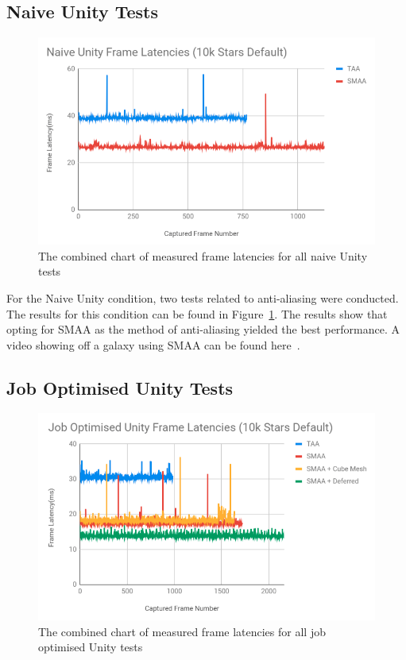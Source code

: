 \subsection{Naive Unity Tests}
\begin{figure}[!p]
    \centering
    \includegraphics[width=1\textwidth]{Figures/naiveUnityLatencies.png}
    \caption[Combined Frame Latency Chart for Naive Unity Tests]{The combined chart of measured frame latencies for all naive Unity tests}
    \label{fig:naiveUnityLatency}
\end{figure}

For the Naive Unity condition, two tests related to anti-aliasing were conducted. The results for this condition can be found in Figure~\ref{fig:naiveUnityLatency}. The results show that opting for SMAA as the method of anti-aliasing yielded the best performance. A video showing off a galaxy using SMAA can be found here~\cite{naiveUnityVideo}. 

\subsection{Job Optimised Unity Tests}
\begin{figure}[!p]
    \centering
    \includegraphics[width=1\textwidth]{Figures/jobOptimisedUnityLatencies.png}
    \caption[Combined Frame Latency Chart for Job Optimised Unity Tests]{The combined chart of measured frame latencies for all job optimised Unity tests}
    \label{fig:jobOptimisedUnityLatency}
\end{figure}

